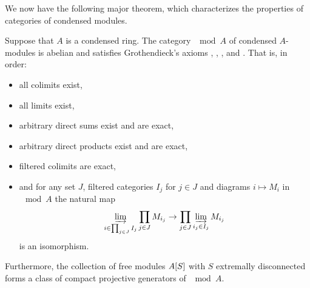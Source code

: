 We now have the following major theorem, which characterizes the properties of categories of condensed modules.
\begin{theorem}
	\label{theorem: condensed modules form an abelian category}
	
	Suppose that $A$ is a condensed ring. The category $\mod{A}$ of condensed $A$-modules is abelian and satisfies Grothendieck's axioms , ,  ,  and . That is, in order:
	\begin{itemize}
		\item all colimits exist,
		\item all limits exist,
		\item arbitrary direct sums exist and are exact,
		\item arbitrary direct products exist and are exact,
		\item filtered colimits are exact,
		\item and for any set $J$, filtered categories $I_j$ for $j\in J$ and diagrams $i\mapsto M_i$ in $\mod{A}$ the natural map
			$$\varinjlim_{i\in\prod_{j\in J} I_j} \prod_{j\in J} M_{i_j} \to \prod_{j\in J} \varinjlim_{i_j \in I_j} M_{i_j}$$
		is an isomorphism.
	\end{itemize}
	Furthermore, the collection of free modules ${A[S]}$ with $S$ extremally disconnected forms a class of compact projective generators of $\mod{A}$.
\end{theorem}
